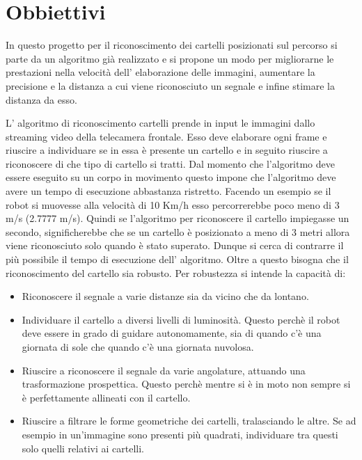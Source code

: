 \section{Obbiettivi}

	In questo progetto per il riconoscimento dei cartelli posizionati sul percorso si parte da un algoritmo già realizzato e si propone un modo per migliorarne le prestazioni nella velocità dell' elaborazione delle immagini, aumentare la precisione e la distanza a cui viene riconosciuto un segnale e infine stimare la distanza da esso.
	
	L' algoritmo di riconoscimento cartelli prende in input le immagini dallo streaming video della telecamera frontale. Esso deve elaborare ogni frame e riuscire a individuare se in essa è presente un cartello e in seguito riuscire a riconoscere di che tipo di cartello si tratti. Dal momento che l'algoritmo deve essere eseguito su un corpo in movimento questo impone che l'algoritmo deve avere un tempo di esecuzione abbastanza ristretto. Facendo un esempio se il robot si muovesse alla velocità di 10 Km/h esso percorrerebbe poco meno di 3 m/s (2.7777 m/s). Quindi se l'algoritmo per riconoscere il cartello impiegasse un secondo, significherebbe che se un cartello è posizionato a meno di 3 metri allora viene riconosciuto solo quando è stato superato. Dunque si cerca di contrarre il più possibile il tempo di esecuzione dell' algoritmo. Oltre a questo bisogna che il riconoscimento del cartello sia robusto. Per robustezza si intende la capacità di:
	\begin{itemize}
		\item Riconoscere il segnale a varie distanze sia da vicino che da lontano.
		\item Individuare il cartello a diversi livelli di luminosità. Questo perchè il robot deve essere in grado di guidare autonomamente, sia di quando c'è una giornata di sole che quando c'è una giornata nuvolosa.
		\item Riuscire a riconoscere il segnale da varie angolature, attuando una trasformazione prospettica. Questo perchè mentre si è in moto non sempre si è perfettamente allineati con il cartello. 
		\item Riuscire a filtrare le forme geometriche dei cartelli, tralasciando le altre. Se ad esempio in un'immagine sono presenti più quadrati, individuare tra questi solo quelli relativi ai cartelli.
	\end{itemize}

